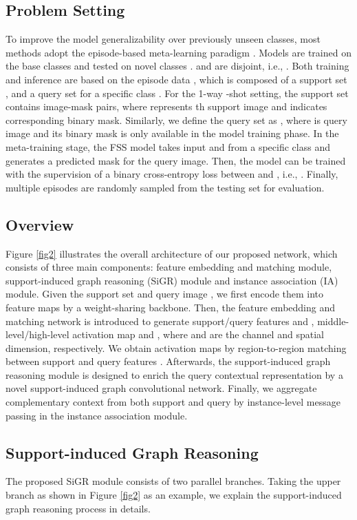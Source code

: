\documentclass{bmvc2k}
\begin{document}
\subsection{Problem Setting}
To improve the model generalizability over previously unseen classes,  most methods adopt the episode-based meta-learning paradigm \cite{shaban2017one,vinyals2016matching}. 
Models are trained on the base classes  and tested on novel classes .  and  are disjoint, i.e., .
Both training and inference are based on the episode data , which is composed of a support set , and a query set  for a specific class .
For the 1-way -shot setting, the support set  contains  image-mask pairs, where  represents th support image and  indicates corresponding binary mask. Similarly, we define the query set as , where  is query image and its binary mask  is only available in the model training phase.
In the meta-training stage, the FSS model  takes input  and  from a specific class  and generates a predicted mask  for the query image.
Then, the model can be trained with the supervision of a binary cross-entropy loss between  and , i.e., .
Finally, multiple episodes  are randomly sampled from the testing set  for evaluation.
\subsection{Overview}
\label{sec3.3}
Figure \ref{fig2} illustrates the overall architecture of our proposed network, which consists of three main components: feature embedding and matching module, support-induced graph reasoning (SiGR) module and instance association (IA) module. Given the support set  and query image , we first encode them into feature maps by a weight-sharing backbone. Then, the feature embedding and matching network is introduced to generate support/query features  and , middle-level/high-level activation map  and , where  and  are the channel and spatial dimension, respectively. We obtain activation maps by region-to-region matching between support and query features \cite{luo2021pfenet++}. Afterwards, the support-induced graph reasoning module is designed to enrich the query contextual representation by a novel support-induced graph convolutional network. Finally, we aggregate complementary context from both support and query by instance-level message passing in the instance association module.
\subsection{Support-induced Graph Reasoning}
The proposed SiGR module consists of two parallel branches. Taking the upper branch as shown in Figure \ref{fig2} as an example, we explain the support-induced graph reasoning process in details.
\end{document}
